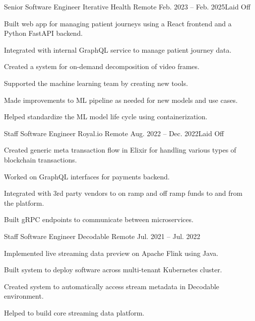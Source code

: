 \begin{cventries}
  \cventry
    {Senior Software Engineer} %
    {Iterative Health} %
    {Remote} %
    {Feb. 2023 – Feb. 2025\newline Laid Off} %
    {
      \begin{cvitems} %
        \item {Built web app for managing patient journeys using a React frontend and a Python FastAPI backend.}
        \item {Integrated with internal GraphQL service to manage patient journey data.}
        \item {Created a system for on-demand decomposition of video frames.}
        \item {Supported the machine learning team by creating new tools.}
        \item {Made improvements to ML pipeline as needed for new models and use cases.}
        \item {Helped standardize the ML model life cycle using containerization.}
      \end{cvitems}
    }

  \cventry
    {Staff Software Engineer} %
    {Royal.io} %
    {Remote} %
    {Aug. 2022 – Dec. 2022\newline Laid Off} %
    {
      \begin{cvitems} %
        \item {Created generic meta transaction flow in Elixir for handling various types of blockchain transactions.}
        \item {Worked on GraphQL interfaces for payments backend.}
        \item {Integrated with 3rd party vendors to on ramp and off ramp funds to and from the platform.}
        \item {Built gRPC endpoints to communicate between microservices.}
      \end{cvitems}
    }

  \cventry
    {Staff Software Engineer} %
    {Decodable} %
    {Remote} %
    {Jul. 2021 – Jul. 2022} %
    {
      \begin{cvitems} %
        \item {Implemented live streaming data preview on Apache Flink using Java.}
        \item {Built system to deploy software across multi-tenant Kubernetes cluster.}
        \item {Created system to automatically access stream metadata in Decodable environment.}
        \item {Helped to build core streaming data platform.}
      \end{cvitems}
    }


\end{cventries}
